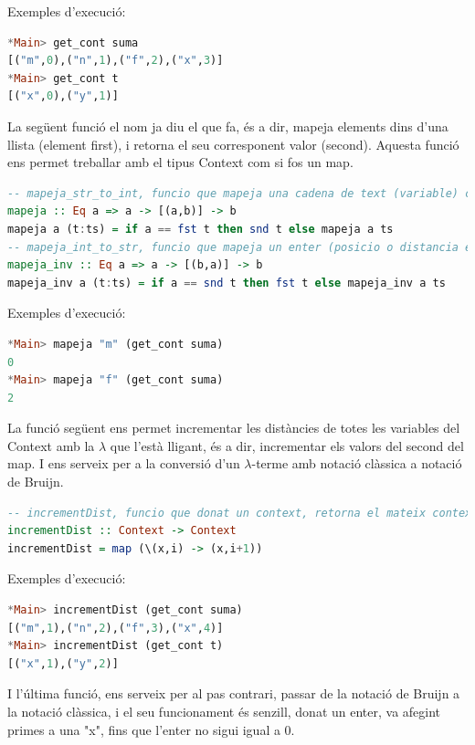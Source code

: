 \documentclass[10pt,a4paper]{article}
\begin{document}
Exemples d'execució:

\begin{lstlisting}[language=Haskell]
*Main> get_cont suma
[("m",0),("n",1),("f",2),("x",3)]
*Main> get_cont t
[("x",0),("y",1)]
\end{lstlisting}

La següent funció el nom ja diu el que fa, és a dir, mapeja elements dins d'una llista (element first), i retorna el seu corresponent valor (second). Aquesta funció ens permet treballar amb el tipus Context com si fos un map.

\begin{lstlisting}[language=Haskell]
-- mapeja_str_to_int, funcio que mapeja una cadena de text (variable) cap a un enter (posicio o distancia en lambdes)
mapeja :: Eq a => a -> [(a,b)] -> b
mapeja a (t:ts) = if a == fst t then snd t else mapeja a ts
-- mapeja_int_to_str, funcio que mapeja un enter (posicio o distancia en lambdes) cap a una cadena de text (variable)
mapeja_inv :: Eq a => a -> [(b,a)] -> b
mapeja_inv a (t:ts) = if a == snd t then fst t else mapeja_inv a ts
\end{lstlisting}

Exemples d'execució:

\begin{lstlisting}[language=Haskell]
*Main> mapeja "m" (get_cont suma)
0
*Main> mapeja "f" (get_cont suma)
2
\end{lstlisting}

La funció següent ens permet incrementar les distàncies de totes les variables del Context amb la $\lambda$ que l'està lligant, és a dir, incrementar els valors del second del map. I ens serveix per a la conversió d'un $\lambda$-terme amb notació clàssica a notació de Bruijn.

\begin{lstlisting}[language=Haskell]
-- incrementDist, funcio que donat un context, retorna el mateix context al que se li han incrementat les distancies de cada variable
incrementDist :: Context -> Context
incrementDist = map (\(x,i) -> (x,i+1))
\end{lstlisting}

Exemples d'execució:

\begin{lstlisting}[language=Haskell]
*Main> incrementDist (get_cont suma)
[("m",1),("n",2),("f",3),("x",4)]
*Main> incrementDist (get_cont t)
[("x",1),("y",2)]
\end{lstlisting}

I l'última funció, ens serveix per al pas contrari, passar de la notació de Bruijn a la notació clàssica, i el seu funcionament és senzill, donat un enter, va afegint primes a una "x", fins que l'enter no sigui igual a 0.
\end{document}
